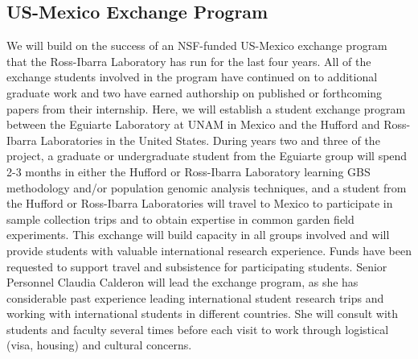 \subsection*{US-Mexico Exchange Program}
We will build on the success of an NSF-funded US-Mexico exchange program that the Ross-Ibarra Laboratory has run for the last four years.  
All of the exchange students involved in the program have continued on to additional graduate work and two have earned authorship on published or forthcoming papers from their internship.  
Here, we will establish a student exchange program between the Eguiarte Laboratory at UNAM in Mexico and the Hufford and Ross-Ibarra Laboratories in the United States.
During years two and three of the project, a graduate or undergraduate student from the Eguiarte group will spend 2-3 months in either the Hufford or Ross-Ibarra Laboratory learning GBS methodology and/or population genomic analysis techniques, and a student from the Hufford or Ross-Ibarra Laboratories will travel to Mexico to participate in sample collection trips and to obtain expertise in common garden field experiments. 
This exchange will build capacity in all groups involved and will provide students with valuable international research experience. 
Funds have been requested to support travel and subsistence for participating students. 
Senior Personnel Claudia Calderon will lead the exchange program, as she has considerable past experience leading international student research trips and working with international students in different countries.
She will consult with students and faculty several times before each visit to work through logistical (visa, housing) and cultural concerns.



